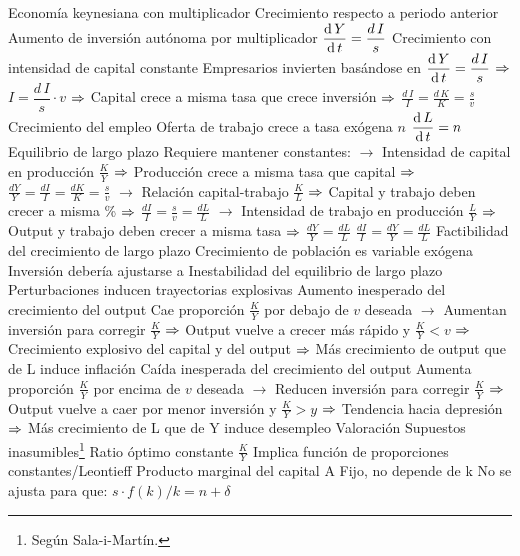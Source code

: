 \documentclass{nuevotema}
\begin{document}
\begin{esquemal}
				\4 Economía keynesiana con multiplicador
				\4 Crecimiento respecto a periodo anterior
				\4[] Aumento de inversión autónoma por multiplicador
				\4[] $\dfrac{\text{d} \, Y}{\text{d} \, t} = \dfrac{d \, I}{s}$
			\3 Crecimiento con intensidad de capital constante
				\4 Empresarios invierten basándose en $\dfrac{\text{d} \, Y}{\text{d} \, t} = \dfrac{d \, I}{s}$
				\4[] $\then$ $I = \dfrac{d \, I}{s} \cdot v$ $\then$ 
				\4[] Capital crece a misma tasa que crece inversión
				\4[] $\then$ $\frac{d \, I}{I} = \frac{d \, K}{K} = \frac{s}{v}$
			\3 Crecimiento del empleo
				\4 Oferta de trabajo crece a tasa exógena $n$
				\4[] $\dfrac{\text{d} \, L}{\text{d} \, t} = n$
			\3 Equilibrio de largo plazo
				\4 Requiere mantener constantes:
				\4[] $\to$ Intensidad de capital en producción $\frac{K}{Y}$
				\4[] $\then$ Producción crece a misma tasa que capital
				\4[] $\then$ $\frac{dY}{Y} = \frac{dI}{I} = \frac{dK}{K} = \frac{s}{v}$
				\4[] $\to$ Relación capital-trabajo $\frac{K}{L}$
				\4[] $\then$ Capital y trabajo deben crecer a misma \%
				\4[] $\then$ $\frac{dI}{I} = \frac{s}{v} = \frac{dL}{L}$
				\4[] $\to$ Intensidad de trabajo en producción $\frac{L}{Y}$
				\4[] $\then$ Output y trabajo deben crecer a misma tasa
				\4[] $\then$ $\frac{dY}{Y} = \frac{dL}{L}$
				\4[$\then$] $\frac{d I}{I} = \frac{d Y}{Y} = \frac{d L}{L}$
			\3 Factibilidad del crecimiento de largo plazo
				\4 Crecimiento de población es variable exógena
				\4[$\then$] Inversión debería ajustarse a
			\3 Inestabilidad del equilibrio de largo plazo
				\4 Perturbaciones inducen trayectorias explosivas
				\4 Aumento inesperado del crecimiento del output
				\4[] Cae proporción $\frac{K}{Y}$ por debajo de $v$ deseada
				\4[] $\to$ Aumentan inversión para corregir $\frac{K}{Y}$
				\4[] $\then$ Output vuelve a crecer más rápido y $\frac{K}{Y} < v$
				\4[] $\then$ Crecimiento explosivo del capital y del output
				\4[] $\then$ Más crecimiento de output que de L induce inflación
				\4 Caída inesperada del crecimiento del output
				\4[] Aumenta proporción $\frac{K}{Y}$ por encima de $v$ deseada
				\4[] $\to$ Reducen inversión para corregir $\frac{K}{Y}$
				\4[] $\then$ Output vuelve a caer por menor inversión y $\frac{K}{Y} > y$
				\4[] $\then$ Tendencia hacia depresión
				\4[] $\then$ Más crecimiento de L que de Y induce desempleo
		\2 Valoración
			\3 Supuestos inasumibles\footnote{Según Sala-i-Martín.}
				\4 Ratio óptimo constante $\frac{K}{Y}$
				\4[] Implica función de proporciones constantes/Leontieff
				\4 Producto marginal del capital A
				\4[] Fijo, no depende de k
				\4[] No se ajusta para que: $s \cdot f(k)/k = n + \delta$

\end{esquemal}
\end{document}
